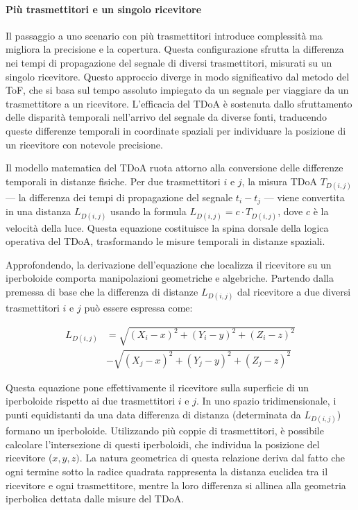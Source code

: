 \paragraph{Più trasmettitori e un singolo ricevitore}

Il passaggio a uno scenario con più trasmettitori introduce complessità ma migliora la precisione e la copertura. Questa configurazione sfrutta la differenza nei tempi di propagazione del segnale di diversi trasmettitori, misurati su un singolo ricevitore. Questo approccio diverge in modo significativo dal metodo del ToF, che si basa sul tempo assoluto impiegato da un segnale per viaggiare da un trasmettitore a un ricevitore. L'efficacia del TDoA è sostenuta dallo sfruttamento delle disparità temporali nell'arrivo del segnale da diverse fonti, traducendo queste differenze temporali in coordinate spaziali per individuare la posizione di un ricevitore con notevole precisione.

Il modello matematica del TDoA ruota attorno alla conversione delle differenze temporali in distanze fisiche. Per due trasmettitori \(i\) e \(j\), la misura TDoA \(T_{D(i,j)}\) — la differenza dei tempi di propagazione del segnale \(t_i - t_j\) — viene convertita in una distanza \(L_{D(i,j)}\) usando la formula \(L_{D(i,j)} = c \cdot T_{D(i,j)}\), dove \(c\) è la velocità della luce. Questa equazione costituisce la spina dorsale della logica operativa del TDoA, trasformando le misure temporali in distanze spaziali.

Approfondendo, la derivazione dell'equazione che localizza il ricevitore su un iperboloide comporta manipolazioni geometriche e algebriche. Partendo dalla premessa di base che la differenza di distanze \(L_{D(i, j)}\) dal ricevitore a due diversi trasmettitori \(i\) e \(j\) può essere espressa come:

\begin{equation}
    \begin{aligned}
        L_{D(i, j)} & =\sqrt{\left(X_i-x\right)^2+\left(Y_i-y\right)^2+\left(Z_i-z\right)^2} \\
        & -\sqrt{\left(X_j-x\right)^2+\left(Y_j-y\right)^2+\left(Z_j-z\right)^2}
    \end{aligned}
\end{equation}

\noindent Questa equazione pone effettivamente il ricevitore sulla superficie di un iperboloide rispetto ai due trasmettitori \(i\) e \(j\). In uno spazio tridimensionale, i punti equidistanti da una data differenza di distanza (determinata da \(L_{D(i, j)}\)) formano un iperboloide. Utilizzando più coppie di trasmettitori, è possibile calcolare l'intersezione di questi iperboloidi, che individua la posizione del ricevitore (\(x, y, z)\). La natura geometrica di questa relazione deriva dal fatto che ogni termine sotto la radice quadrata rappresenta la distanza euclidea tra il ricevitore e ogni trasmettitore, mentre la loro differenza si allinea alla geometria iperbolica dettata dalle misure del TDoA.

